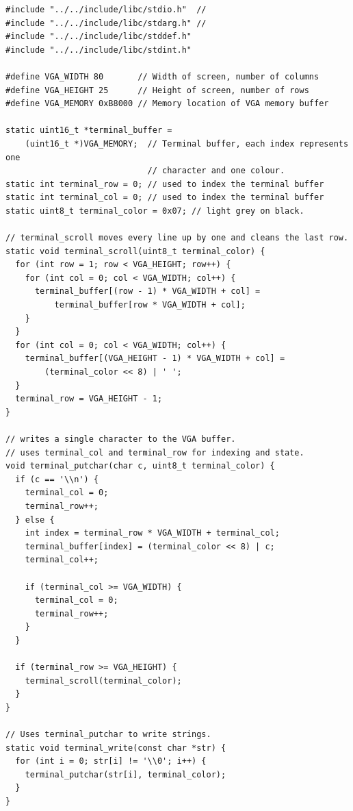 \documentclass[../main.tex]{subfiles}
\begin{document}
\begin{listing}[H]
    \begin{verbatim}
#include "../../include/libc/stdio.h"  //
#include "../../include/libc/stdarg.h" //
#include "../../include/libc/stddef.h"
#include "../../include/libc/stdint.h"

#define VGA_WIDTH 80       // Width of screen, number of columns
#define VGA_HEIGHT 25      // Height of screen, number of rows
#define VGA_MEMORY 0xB8000 // Memory location of VGA memory buffer

static uint16_t *terminal_buffer =
    (uint16_t *)VGA_MEMORY;  // Terminal buffer, each index represents one
                             // character and one colour.
static int terminal_row = 0; // used to index the terminal buffer
static int terminal_col = 0; // used to index the terminal buffer
static uint8_t terminal_color = 0x07; // light grey on black.

// terminal_scroll moves every line up by one and cleans the last row.
static void terminal_scroll(uint8_t terminal_color) {
  for (int row = 1; row < VGA_HEIGHT; row++) {
    for (int col = 0; col < VGA_WIDTH; col++) {
      terminal_buffer[(row - 1) * VGA_WIDTH + col] =
          terminal_buffer[row * VGA_WIDTH + col];
    }
  }
  for (int col = 0; col < VGA_WIDTH; col++) {
    terminal_buffer[(VGA_HEIGHT - 1) * VGA_WIDTH + col] =
        (terminal_color << 8) | ' ';
  }
  terminal_row = VGA_HEIGHT - 1;
}

// writes a single character to the VGA buffer.
// uses terminal_col and terminal_row for indexing and state.
void terminal_putchar(char c, uint8_t terminal_color) {
  if (c == '\\n') {
    terminal_col = 0;
    terminal_row++;
  } else {
    int index = terminal_row * VGA_WIDTH + terminal_col;
    terminal_buffer[index] = (terminal_color << 8) | c;
    terminal_col++;

    if (terminal_col >= VGA_WIDTH) {
      terminal_col = 0;
      terminal_row++;
    }
  }

  if (terminal_row >= VGA_HEIGHT) {
    terminal_scroll(terminal_color);
  }
}

// Uses terminal_putchar to write strings.
static void terminal_write(const char *str) {
  for (int i = 0; str[i] != '\\0'; i++) {
    terminal_putchar(str[i], terminal_color);
  }
}


\end{verbatim}
\end{listing}
\end{document}
